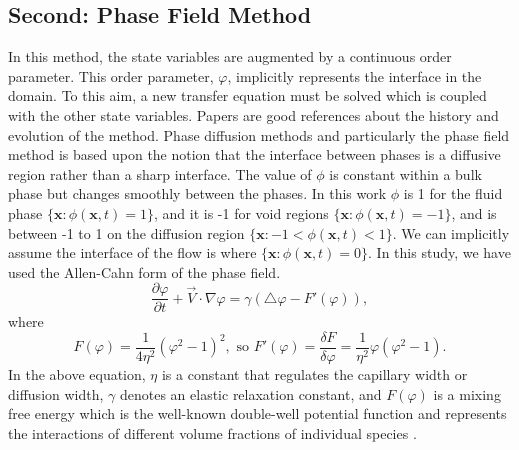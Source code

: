 \documentclass[review]{elsarticle}
\begin{document}
\subsection{Second: Phase Field Method} \label{phase field}
In this method, the state variables are augmented by a continuous
order parameter. This order parameter, $\varphi$, 
implicitly represents the interface in the domain. To this aim, a new transfer equation must be solved which is coupled with the other state variables. 
Papers \cite{Anderson1998,Chen2002,Boettinger2002,Kim2012} are good references about the history and evolution of the method.
Phase diffusion methods and particularly the phase field method is based upon the notion that the interface between phases is a diffusive region rather than a sharp interface. 
The value of $\phi$ is constant within a bulk phase but changes smoothly between the phases. In this work $\phi$ is 1 for the fluid phase $ \lbrace \textbf{x}: \phi(\textbf{x},t)=1 \rbrace  $, 
and it is -1 for void regions $ \lbrace \textbf{x}: \phi(\textbf{x},t)=-1 \rbrace  $, and is between -1 to 1 on the diffusion region $ \lbrace \textbf{x}: -1 < \phi(\textbf{x},t) < 1 \rbrace  $. 
We can implicitly assume the interface of the flow is where $ \lbrace \textbf{x}: \phi(\textbf{x},t)= 0 \rbrace  $.
In this study, we have used the Allen-Cahn form of the phase field. 
\begin{equation} 
        \label{allencahn}
        \frac{\partial \varphi }{\partial t} + \overrightarrow{V}\cdot \nabla \varphi = 
        \gamma (\bigtriangleup\varphi -F'(\varphi)),
\end{equation}
where
\begin{equation} 
        \label{fprime}
        F(\varphi)=\frac{1}{4\eta^2} (\varphi^2-1)^2 ,\text{\ so \ \ } F'(\varphi)= \frac{\delta F}{\delta \varphi} = \frac{1}{\eta^2} \varphi (\varphi^2 -1).
\end{equation}
In the above equation, $\eta$ is a constant that regulates the capillary width or diffusion width, $ \gamma $ denotes an elastic relaxation constant, and $F(\varphi)$ is 
a mixing free energy which is the well-known double-well potential function and represents the interactions of different volume fractions of individual species \cite{Bronsard1990,Larson1999}.
\end{document}
